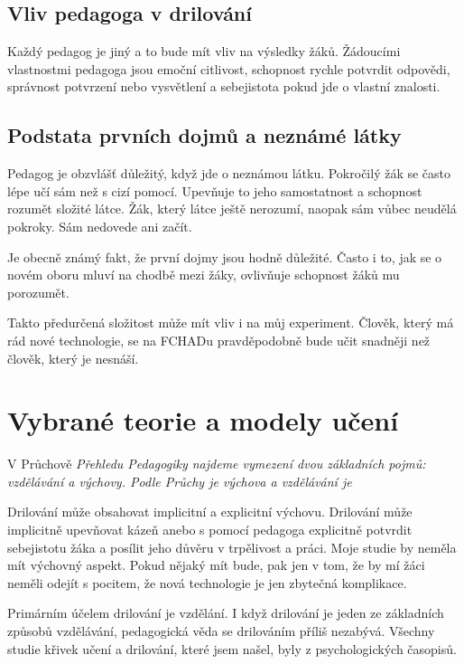 \subsection{Vliv pedagoga v drilování}

Každý pedagog je jiný a to bude mít vliv na výsledky žáků.  Žádoucími vlastnostmi pedagoga jsou emoční citlivost, schopnost rychle potvrdit odpovědi, správnost potvrzení nebo vysvětlení a sebejistota pokud jde o vlastní znalosti.

\subsection{Podstata prvních dojmů a neznámé látky}

Pedagog je obzvlášť důležitý, když jde o neznámou látku.  Pokročilý žák se často lépe učí sám než s cizí pomocí.  Upevňuje to jeho samostatnost a schopnost rozumět složité látce.  Žák, který látce ještě nerozumí, naopak sám vůbec neudělá pokroky.  Sám nedovede ani začít.

Je obecně známý fakt, že první dojmy jsou hodně důležité.  Často i to, jak se o novém oboru mluví na chodbě mezi žáky, ovlivňuje schopnost žáků mu porozumět.

Takto předurčená složitost může mít vliv i na můj experiment. Člověk, který má rád nové technologie, se na FCHADu pravděpodobně bude učit snadněji než člověk, který je nesnáší.

\section{Vybrané teorie a modely učení}

V Průchově \em Přehledu Pedagogiky \em najdeme vymezení dvou základních pojmů: vzdělávání a výchovy.  Podle Průchy je výchova  a vzdělávání je  \citep[str. 16-17]{prucha2009prehled}

Drilování může obsahovat implicitní a explicitní výchovu.  Drilování může implicitně upevňovat kázeň anebo s pomocí pedagoga explicitně potvrdit sebejistotu žáka a posílit jeho důvěru v trpělivost a práci.  Moje studie by neměla mít výchovný aspekt. Pokud nějaký mít bude, pak jen v tom, že by mí žáci neměli odejít s pocitem, že nová technologie je jen zbytečná komplikace.

Primárním účelem drilování je vzdělání.  I když drilování je jeden ze základních způsobů vzdělávání, pedagogická věda se drilováním příliš nezabývá. Všechny studie křivek učení a drilování, které jsem našel, byly z psychologických časopisů.


